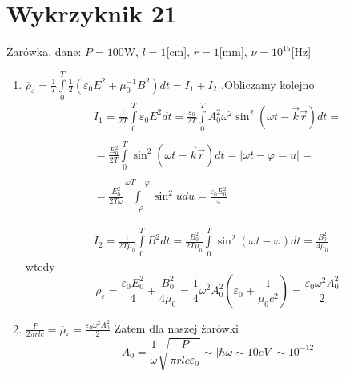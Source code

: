 \documentclass[a4paper,12pt]{article}
\begin{document}
\section{Wykrzyknik 21}
	Żarówka, dane: $P=100$W, $l = 1$[cm], $r=1$[mm], $\nu=10^{15}$[Hz]
	\begin{enumerate}
		\item $\overline{\rho}_\varepsilon  = \frac{1}{T}\int\limits_0^T\frac{1}{2}(\varepsilon_0E^2+\mu_0^{-1}B^2)dt = I_1+I_2$
		.Obliczamy kolejno
		$$
		\begin{gathered}
			I_1 = \frac{1}{2T}\int\limits_0^T\varepsilon_0E^2 dt = \frac{\varepsilon_0}{2T}\int\limits_0^TA_0^2\omega^2\sin^2(\omega t -\vec{k}\vec{r})dt = \\\\
				= \frac{E_0^2}{2T}\int\limits_0^T\sin^2(\omega t -\vec{k}\vec{r})dt = \big\vert \omega t - \varphi = u\big\vert = \\\\
				= \frac{E_0^2}{2T\omega}\int\limits_{-\varphi}^{\omega T-\varphi}\sin^2u du = \frac{\varepsilon_0 E_0^2}{4} \\\\\\
			I_2 = \frac{1}{2T\mu_0}\int\limits_0^T B^2 dt = \frac{B_0^2}{2T\mu_0}\int\limits_0^T\sin^2(\omega t -\varphi)dt = \frac{B_0^2}{4\mu_0}
		\end{gathered}
		$$
		wtedy 
		$$
			\overline{\rho}_\varepsilon = \frac{\varepsilon_0 E_0^2}{4}+ \frac{B_0^2}{4\mu_0} = \frac{1}{4}\omega^2A_0^2(\varepsilon_0+\frac{1}{\mu_0c^2})=\frac{\varepsilon_0\omega^2A_0^2}{2}
		$$
		\item $\frac{P}{2\pi r l c} = \overline{\rho}_\varepsilon = \frac{\varepsilon_0\omega^2A_0^2}{2}$
		Zatem dla naszej żarówki 
		$$
			A_0 = \frac{1}{\omega}\sqrt{\frac{P}{\pi r l c \varepsilon_0}} \sim \big\vert \hbar \omega \sim 10eV\big\vert \sim 10^{-12}
		$$
	\end{enumerate}
\end{document}
